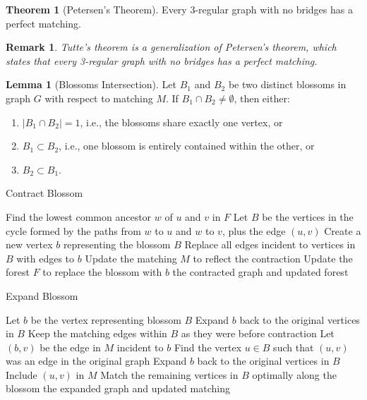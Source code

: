 \documentclass{article}
\newtheorem{remark}{Remark}
\theoremstyle{definition}
\newtheorem{theorem}{Theorem}
\newtheorem{lemma}{Lemma}
\begin{document}
\begin{theorem}[Petersen's Theorem]
Every 3-regular graph with no bridges has a perfect matching.
\end{theorem}

\begin{remark}
Tutte's theorem is a generalization of Petersen's theorem, which states that every 3-regular graph with no bridges has a perfect matching.
\end{remark}

\begin{lemma}[Blossoms Intersection]
Let $B_1$ and $B_2$ be two distinct blossoms in graph $G$ with respect to matching $M$. If $B_1 \cap B_2 \neq \emptyset$, then either:
\begin{enumerate}
  \item $|B_1 \cap B_2| = 1$, i.e., the blossoms share exactly one vertex, or
  \item $B_1 \subset B_2$, i.e., one blossom is entirely contained within the other, or
  \item $B_2 \subset B_1$.
\end{enumerate}
\end{lemma}

\begin{algorithm}
\caption{Contract Blossom}
\begin{algorithmic}[1]
    \State Find the lowest common ancestor $w$ of $u$ and $v$ in $F$
    \State Let $B$ be the vertices in the cycle formed by the paths from $w$ to $u$ and $w$ to $v$, plus the edge $(u, v)$
    \State Create a new vertex $b$ representing the blossom $B$
    \State Replace all edges incident to vertices in $B$ with edges to $b$
    \State Update the matching $M$ to reflect the contraction
    \State Update the forest $F$ to replace the blossom with $b$
    \State \Return the contracted graph and updated forest
\EndProcedure
\end{algorithmic}
\end{algorithm}

\begin{algorithm}
\caption{Expand Blossom}
\begin{algorithmic}[1]
    \State Let $b$ be the vertex representing blossom $B$
        \State Expand $b$ back to the original vertices in $B$
        \State Keep the matching edges within $B$ as they were before contraction
    \Else
        \State Let $(b, v)$ be the edge in $M$ incident to $b$
        \State Find the vertex $u \in B$ such that $(u, v)$ was an edge in the original graph
        \State Expand $b$ back to the original vertices in $B$
        \State Include $(u, v)$ in $M$
        \State Match the remaining vertices in $B$ optimally along the blossom
    \EndIf
    \State \Return the expanded graph and updated matching
\EndProcedure
\end{algorithmic}
\end{algorithm}
\end{document}
